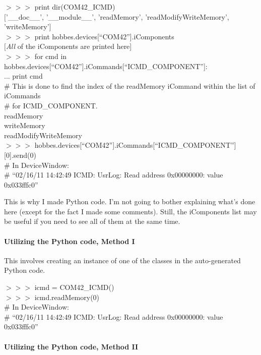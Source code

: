 \noindent $>>>$ print dir(COM42\_ICMD) \\ $[$'\_\_doc\_\_', '\_\_module\_\_', 'readMemory', 'readModifyWriteMemory', 'writeMemory'] \\ $>>>$ print hobbes.devices[``COM42''].iComponents \\ $[$\emph{All} of the iComponents are printed here] \\ $>>>$ for cmd in hobbes.devices[``COM42''].iCommands[``ICMD\_COMPONENT'']: \\ ... \indent print cmd \\ \# This is done to find the index of the readMemory iCommand within the list of iCommands \\ \# for ICMD\_COMPONENT. \\ readMemory \\ writeMemory \\ readModifyWriteMemory \\ $>>>$ hobbes.devices[``COM42''].iCommands[``ICMD\_COMPONENT''][0].send(0) \\ \# In DeviceWindow: \\ \# ``02/16/11 14:42:49 ICMD: UsrLog: Read address 0x00000000: value 0x033fffc0''
\vspace{12pt}

This is why I made Python code. I'm not going to bother explaining what's done here (except for the fact I made some comments). Still, the iComponents list may be useful if you need to see all of them at the same time.



%
%
\paragraph{Utilizing the Python code, Method I}
\label{3.2.4.1}

This involves creating an instance of one of the classes in the auto-generated Python code.

\noindent $>>>$ icmd = COM42\_ICMD() \\ $>>>$ icmd.readMemory(0) \\ \# In DeviceWindow: \\ \# ``02/16/11 14:42:49 ICMD: UsrLog: Read address 0x00000000: value 0x033fffc0''



%
%
\paragraph{Utilizing the Python code, Method II}
\label{3.2.4.2}

